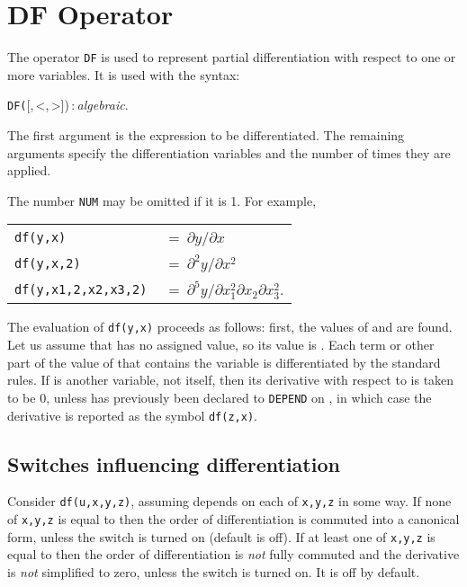 \section{DF Operator}
\label{sec:DF-operator}
\hypertarget{operator:DF}{}
The operator \texttt{DF} is used to represent partial
differentiation with respect
to one or more variables. It is used with the syntax:
\begin{syntax}
  \texttt{DF(}[,\,<,\,>])\,:\,\textit{algebraic}.
\end{syntax}
The first argument is the expression to be differentiated. The remaining
arguments specify the differentiation variables and the number of times
they are applied.

The number \texttt{NUM} may be omitted if it is 1.  For example,
\begin{flushleft}
  \hspace{0.5in}%
  \begin{tabular}{@{}l@{}l}
    \texttt{df(y,x)}            & ~=~$\partial y/\partial x$ \\
    \texttt{df(y,x,2)}          & ~=~$\partial^{2}y/\partial x^{2}$ \\
    \texttt{df(y,x1,2,x2,x3,2)} & ~=~$\partial^{5}y/\partial x_{1}^{2}
    \partial x_{2}\partial x_{3}^{2}$.
  \end{tabular}
\end{flushleft}

The evaluation of \texttt{df(y,x)} proceeds as follows: first, the values of
 and  are found.  Let us assume that  has no assigned
value, so its value is .  Each term or other part of the value of
 that contains the variable  is differentiated by the
standard rules.  If  is another variable, not  itself, then
its derivative with respect to  is taken to be 0, unless 
has previously been declared to \texttt{DEPEND} on , in which
case the derivative is reported as the symbol \texttt{df(z,x)}.


\subsection{Switches influencing differentiation}
\hypertarget{switch:COMMUTEDF}{}
\hypertarget{switch:NOCOMMUTEDF}{}
\hypertarget{switch:SIMPNONCOMDF}{}

Consider \texttt{df(u,x,y,z)}, assuming  depends on each of \texttt{x,y,z}
in some way.  If none of \texttt{x,y,z} is equal to 
then the order of differentiation is commuted into a canonical form, unless the
switch  is turned on (default is off).
If at least one of \texttt{x,y,z} is equal to  then the order of
differentiation is \emph{not} fully commuted and the derivative is \emph{not}
simplified
to zero, unless the switch  is turned on.
It is off by default.

